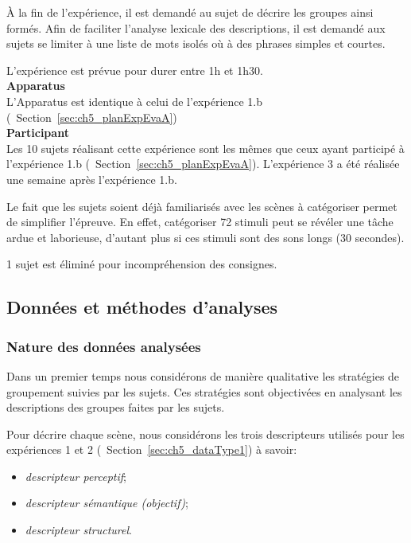 À la fin de l'expérience, il est demandé au sujet de décrire les groupes ainsi formés. Afin de faciliter l'analyse lexicale des descriptions, il est demandé aux sujets se limiter à une liste de mots isolés où à des phrases simples et courtes.

L'expérience est prévue pour durer entre 1h et 1h30. \\

\textbf{Apparatus} \\

L'Apparatus est identique à celui de l'expérience 1.b (\cf~Section~\ref{sec:ch5_planExpEvaA}) \\

\textbf{Participant} \\

Les 10 sujets réalisant cette expérience sont les mêmes que ceux ayant participé à l'expérience 1.b (\cf~Section~\ref{sec:ch5_planExpEvaA}). L'expérience 3 a été réalisée une semaine après l'expérience 1.b. 

Le fait que les sujets soient déjà familiarisés avec les scènes à catégoriser permet de simplifier l'épreuve. En effet, catégoriser 72 stimuli peut se révéler une tâche ardue et laborieuse, d'autant plus si ces stimuli sont des sons longs (30 secondes).

1 sujet est éliminé pour incompréhension des consignes.

\subsection{Données et méthodes d'analyses}

\subsubsection{Nature des données analysées}
\label{sec:ch5_dataXp3}

Dans un premier temps nous considérons de manière qualitative les stratégies de groupement suivies par les sujets. Ces stratégies sont objectivées en analysant les descriptions des groupes faites par les sujets.

Pour décrire chaque scène, nous considérons les trois descripteurs utilisés pour les expériences 1 et 2 (\cf~Section~\ref{sec:ch5_dataType1}) à savoir:

\begin{itemize}
\item \emph{descripteur perceptif};
\item \emph{descripteur sémantique (objectif)};
\item \emph{descripteur structurel}.
\end{itemize}

